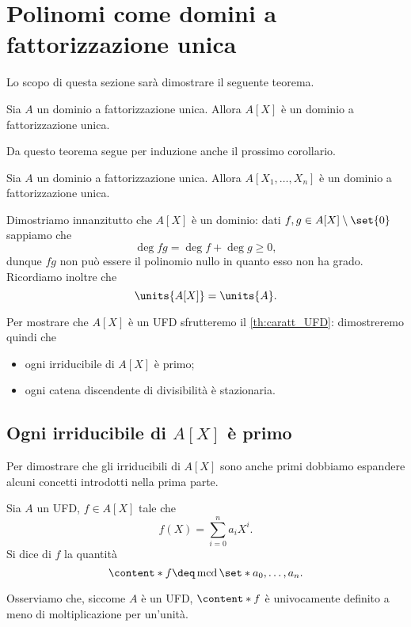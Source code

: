 \section{Polinomi come domini a fattorizzazione unica}

Lo scopo di questa sezione sarà dimostrare il seguente teorema.
\begin{theorem}
    Sia $A$ un dominio a fattorizzazione unica. Allora $A[X]$ è un dominio a fattorizzazione unica.
\end{theorem}

Da questo teorema segue per induzione anche il prossimo corollario.
\begin{corollary}
    Sia $A$ un dominio a fattorizzazione unica. Allora $A[X_1, \dots, X_n]$ è un dominio a fattorizzazione unica.
\end{corollary}

Dimostriamo innanzitutto che $A[X]$ è un dominio: dati $f, g \in A[X] \setminus \set{0}$ sappiamo che \[
    \deg fg = \deg f + \deg g \geq 0,    
\] dunque $fg$ non può essere il polinomio nullo in quanto esso non ha grado. Ricordiamo inoltre che \[
    \units{A[X]} = \units{A}.    
\]

Per mostrare che $A[X]$ è un UFD sfrutteremo il \autoref{th:caratt_UFD}: dimostreremo quindi che \begin{itemize}
    \item ogni irriducibile di $A[X]$ è primo;
    \item ogni catena discendente di divisibilità è stazionaria.
\end{itemize}

\subsection*{Ogni irriducibile di $A[X]$ è primo}

Per dimostrare che gli irriducibili di $A[X]$ sono anche primi dobbiamo espandere alcuni concetti introdotti nella prima parte.

\begin{definition}
    Sia $A$ un UFD, $f \in A[X]$ tale che \[
        f(X) = \sum_{i=0}^n a_iX^i.    
    \] Si dice  di $f$ la quantità \[
        \content*{f} \deq \operatorname{mcd}\set*{a_0, \dots, a_n}.
    \]
\end{definition}

Osserviamo che, siccome $A$ è un UFD, $\content*{f}$ è univocamente definito a meno di moltiplicazione per un'unità.


